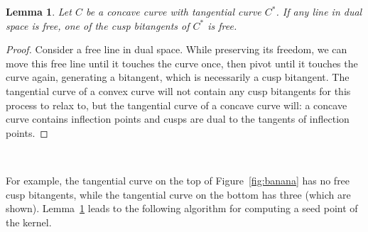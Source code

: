 \documentclass{sig-alternate}
\newcommand{\Comment}[1]{\relax}  %
\newcommand{\QED}{\vrule height 1.4ex width 1.0ex depth -.1ex\ \vspace{.3in}} %
\newcommand{\prf}{\noindent{{\bf Proof}:\ \ \ }}
\newtheorem{lemma}[theorem]{Lemma}
\newtheorem{corollary}[theorem]{Corollary}
\begin{document}
\begin{lemma}
\label{lem:cuspisenough}
Let $C$ be a concave curve with tangential curve $C^*$.
If any line in dual space is free,
one of the cusp bitangents of $C^*$ is free.
\end{lemma}
\ifACM
\begin{proof}
\else
\prf
\fi
Consider a free line in dual space.
While preserving its freedom, we can move this free line 
until it touches the curve once,
then pivot until it touches the curve again, generating a bitangent,
which is necessarily a cusp bitangent.
The tangential curve of a convex curve will not contain any cusp bitangents
for this process to relax to, but the tangential curve of a concave curve will:
a concave curve contains inflection points and
cusps are dual to the tangents of inflection points.
\Comment{This pivoting is possible because the bitangent is a cusp bitangent.}
%
%
\ifACM
\end{proof}
\else
\QED
\fi


For example, the tangential curve on the top of Figure~\ref{fig:banana}
has no free cusp bitangents, while the tangential curve on the bottom
has three (which are shown).
Lemma~\ref{lem:cuspisenough} leads to the following algorithm for computing a seed point of the kernel.
\end{document}
